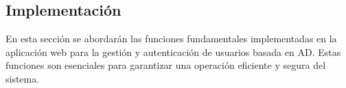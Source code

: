 \subsection{Implementación}

En esta sección se abordarán las funciones fundamentales implementadas en la aplicación web para la gestión y autenticación de usuarios basada en AD. Estas funciones son esenciales para garantizar una operación eficiente y segura del sistema.



